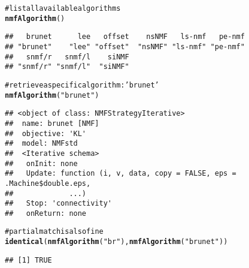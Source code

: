 \documentclass[a4paper]{article}\usepackage{graphicx, color}
\makeatletter
\newcommand{\hlfunctioncall}[1]{\textcolor[rgb]{0.501960784313725,0,0.329411764705882}{\textbf{#1}}}%
\newcommand{\hlstring}[1]{\textcolor[rgb]{0.6,0.6,1}{#1}}%
\newcommand{\hlcomment}[1]{\textcolor[rgb]{0.180392156862745,0.6,0.341176470588235}{#1}}%
\newenvironment{kframe}{%
 \def\at@end@of@kframe{}%
 \ifinner\ifhmode%
  \def\at@end@of@kframe{\end{minipage}}%
  \begin{minipage}{\columnwidth}%
 \fi\fi%
 \def\FrameCommand##1{\hskip\@totalleftmargin \hskip-\fboxsep
 \colorbox{shadecolor}{##1}\hskip-\fboxsep
     \hskip-\linewidth \hskip-\@totalleftmargin \hskip\columnwidth}%
 \MakeFramed {\advance\hsize-\width
   \@totalleftmargin\z@ \linewidth\hsize
   \@setminipage}}%
 {\par\unskip\endMakeFramed%
 \at@end@of@kframe}
\newenvironment{knitrout}{}{} %
\makeatother
\begin{document}
\begin{knitrout}
\color{fgcolor}\begin{kframe}
\begin{alltt}
\hlcomment{# list all available algorithms}
\hlfunctioncall{nmfAlgorithm}()
\end{alltt}
\begin{verbatim}
##   brunet      lee   offset    nsNMF   ls-nmf   pe-nmf 
## "brunet"    "lee" "offset"  "nsNMF" "ls-nmf" "pe-nmf" 
##   snmf/r   snmf/l    siNMF 
## "snmf/r" "snmf/l"  "siNMF"
\end{verbatim}
\begin{alltt}
\hlcomment{# retrieve a specific algorithm: \hlstring{'brunet'}}
\hlfunctioncall{nmfAlgorithm}(\hlstring{"brunet"})
\end{alltt}
\begin{verbatim}
## <object of class: NMFStrategyIterative>
##  name: brunet [NMF]
##  objective: 'KL' 
##  model: NMFstd 
##  <Iterative schema>
##   onInit: none
##   Update: function (i, v, data, copy = FALSE, eps = .Machine$double.eps,
##             ...)
##   Stop: 'connectivity'
##   onReturn: none
\end{verbatim}
\begin{alltt}
\hlcomment{# partial match is also fine}
\hlfunctioncall{identical}(\hlfunctioncall{nmfAlgorithm}(\hlstring{"br"}), \hlfunctioncall{nmfAlgorithm}(\hlstring{"brunet"}))
\end{alltt}
\begin{verbatim}
## [1] TRUE
\end{verbatim}
\end{kframe}
\end{knitrout}
\end{document}
